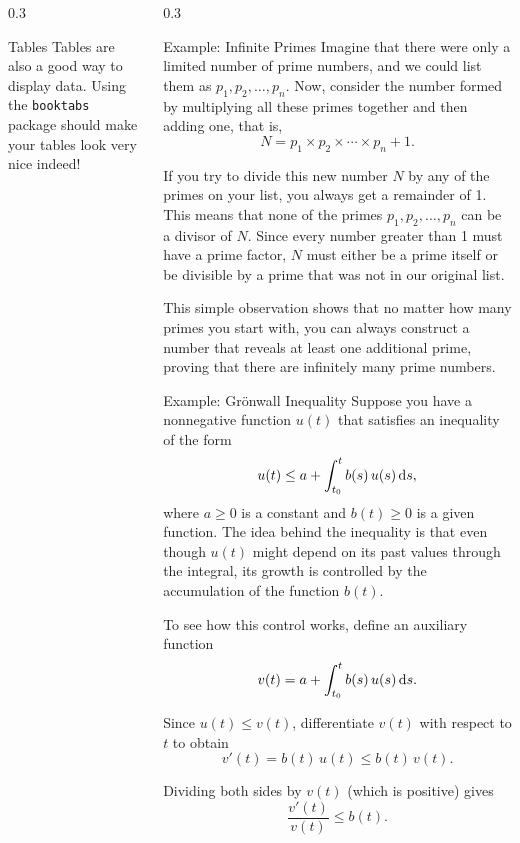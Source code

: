 \documentclass[final]{beamer}
\begin{document}
\begin{frame}[fragile]
\begin{columns}[t]
\begin{column}{0.3\paperwidth}
\begin{block}{Tables}
    Tables are also a good way to display data. Using the \texttt{booktabs}
    package should make your tables look very nice indeed!
\end{block}

\end{column}

\separatorcolumn

\begin{column}{0.3\paperwidth}

\begin{exampleblock}{Example: Infinite Primes}
    Imagine that there were only a limited number of prime numbers, and we could
    list them as \(p_1, p_2, \ldots, p_n\). Now, consider the number formed by
    multiplying all these primes together and then adding one, that is,
    \[
    N = p_1 \times p_2 \times \cdots \times p_n + 1.
    \]

    If you try to divide this new number \(N\) by any of the primes on your list,
    you always get a remainder of 1. This means that none of the primes
    \(p_1, p_2, \ldots, p_n\) can be a divisor of \(N\). Since every number
    greater than 1 must have a prime factor, \(N\) must either be a prime
    itself or be divisible by a prime that was not in our original list.

    This simple observation shows that no matter how many primes you start with,
    you can always construct a number that reveals at least one additional prime,
    proving that there are infinitely many prime numbers.
\end{exampleblock}

\begin{exampleblock}{Example: Grönwall Inequality}
    Suppose you have a nonnegative function \(u(t)\) that satisfies an inequality
    of the form
    \[
        u(t) \le a + \int_{t_0}^t b(s)\, u(s) \dx[s],
    \]
    where \(a \ge 0\) is a constant and \(b(t) \ge 0\) is a given function. The
    idea behind the inequality is that even though \(u(t)\) might depend on its
    past values through the integral, its growth is controlled by the accumulation
    of the function \(b(t)\).

    To see how this control works, define an auxiliary function
    \[
        v(t) = a + \int_{t_0}^t b(s)\, u(s) \dx[s].
    \]

    Since \(u(t) \le v(t)\), differentiate \(v(t)\) with respect to \(t\) to obtain
    \[
        v'(t) = b(t)\, u(t) \le b(t)\, v(t).
    \]

    Dividing both sides by \(v(t)\) (which is positive) gives
    \[
        \frac{v'(t)}{v(t)} \le b(t).
    \]


\end{exampleblock}
\end{column}
\end{columns}
\end{frame}
\end{document}

